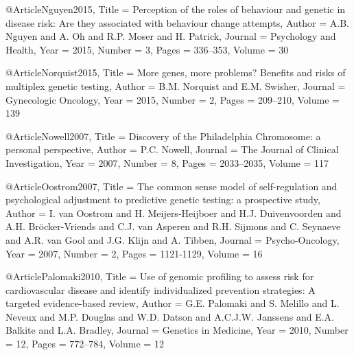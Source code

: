 @Article{Nguyen2015,
  Title                    = {Perception of the roles of behaviour and genetic in disease risk: Are they associated with behaviour change attempts},
  Author                   = {A.B. Nguyen and A. Oh and R.P. Moser and H. Patrick},
  Journal                  = {Psychology and Health},
  Year                     = {2015},
  Number                   = {3},
  Pages                    = {336--353},
  Volume                   = {30}
}

@Article{Norquist2015,
  Title                    = {More genes, more problems? Benefits and risks of multiplex genetic testing},
  Author                   = {B.M. Norquist and E.M. Swisher},
  Journal                  = {Gynecologic Oncology},
  Year                     = {2015},
  Number                   = {2},
  Pages                    = {209--210},
  Volume                   = {139}
}

@Article{Nowell2007,
  Title                    = {Discovery of the Philadelphia Chromosome: a personal perspective},
  Author                   = {P.C. Nowell},
  Journal                  = {The Journal of Clinical Investigation},
  Year                     = {2007},
  Number                   = {8},
  Pages                    = {2033--2035},
  Volume                   = {117}
}

@Article{Oostrom2007,
  Title                    = {The common sense model of self-regulation and psychological adjustment to predictive genetic testing: a prospective study},
  Author                   = {I. van Oostrom and H. Meijers-Heijboer and H.J. Duivenvoorden and A.H. Bröcker-Vriends and C.J. van Asperen and R.H. Sijmons and C. Seynaeve and A.R. van Gool and J.G. Klijn and A. Tibben},
  Journal                  = {Psycho-Oncology},
  Year                     = {2007},
  Number                   = {2},
  Pages                    = {1121-1129},
  Volume                   = {16}
}

@Article{Palomaki2010,
  Title                    = {Use of genomic profiling to assess risk for cardiovascular disease and identify individualized prevention strategies: A targeted evidence-based review},
  Author                   = {G.E. Palomaki and S. Melillo and L. Neveux and M.P. Douglas and W.D. Datson and A.C.J.W. Janssens and E.A. Balkite and L.A. Bradley},
  Journal                  = {Genetics in Medicine},
  Year                     = {2010},
  Number                   = {12},
  Pages                    = {772--784},
  Volume                   = {12}
}

